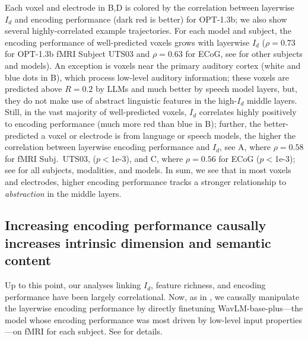 \documentclass{article}
\theoremstyle{plain}
\theoremstyle{definition}
\theoremstyle{remark}
\begin{document}
Each voxel and electrode in B,D is colored by the correlation between layerwise $I_d$ and encoding performance (dark red is better) for OPT-1.3b; we also show several highly-correlated example trajectories. For each model and subject, the encoding performance of well-predicted voxels grows with layerwise $I_d$ ($\rho=0.73$ for OPT-1.3b fMRI Subject UTS03 and $\rho=0.63$ for ECoG, see  for other subjects and models). An exception is voxels near the primary auditory cortex (white and blue dots in B), which process low-level auditory information; these voxels are predicted above $R=0.2$ by LLMs and much better by speech model layers, but, they do not make use of abstract linguistic features in the high-$I_d$ middle layers. Still, in the vast majority of well-predicted voxels, $I_d$ correlates highly positively to encoding performance (much more red than blue in B); further, the better-predicted a voxel or electrode is from language or speech models, the higher the correlation between layerwise encoding performance and $I_d$, see A, where $\rho=0.58$ for fMRI Subj.~UTS03, ($p<$1e-3), and C, where $\rho=0.56$ for ECoG ($p<$1e-3); see  for all subjects, modalities, and models. In sum, we see that in most voxels and electrodes, higher encoding performance tracks a stronger relationship to \emph{abstraction} in the middle layers. 



\subsection{Increasing encoding performance causally increases intrinsic dimension and semantic content
} Up to this point, our analyses linking $I_d$, feature richness, and encoding performance have been largely correlational. Now, as in \citet{vattikonda2025brainwavlmfinetuningspeechrepresentations}, we causally manipulate the layerwise encoding performance by directly finetuning WavLM-base-plus---the model whose encoding performance was most driven by low-level input properties---on fMRI for each subject. See  for details.
\end{document}
